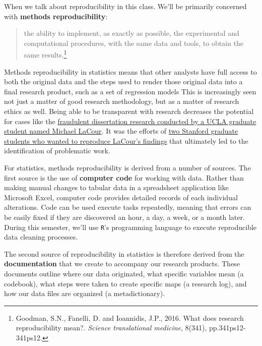 \documentclass[]{book}
\let\rmarkdownfootnote\footnote%
\def\footnote{\protect\rmarkdownfootnote}
\theoremstyle{definition}
\theoremstyle{definition}
\theoremstyle{remark}
\begin{document}
When we talk about reproducibility in this class. We'll be primarily
concerned with \textbf{methods reproducibility}:

\begin{quote}
the ability to implement, as exactly as possible, the experimental and
computational procedures, with the same data and tools, to obtain the
same results.\footnote{Goodman, S.N., Fanelli, D. and Ioannidis, J.P.,
  2016. What does research reproducibility mean?. \emph{Science
  translational medicine}, 8(341), pp.341ps12-341ps12.}
\end{quote}

Methods reproducibility in statistics means that other analysts have
full access to both the original data and the steps used to render those
original data into a final research product, such as a set of regression
models This is increasingly seen not just a matter of good research
methodology, but as a matter of research ethics as well. Being able to
be transparent with research decreases the potential for cases like the
\href{http://nymag.com/scienceofus/2015/05/how-a-grad-student-uncovered-a-huge-fraud.html}{fraudulent
dissertation research conducted by a UCLA graduate student named Michael
LaCour}. It was the efforts of
\href{https://fivethirtyeight.com/features/how-two-grad-students-uncovered-michael-lacour-fraud-and-a-way-to-change-opinions-on-transgender-rights/}{two
Stanford graduate students who wanted to reproduce LaCour's findings}
that ultimately led to the identification of problematic work.

For statistics, methods reproducibility is derived from a number of
sources. The first source is the use of \textbf{computer code} for
working with data. Rather than making manual changes to tabular data in
a spreadsheet application like Microsoft Excel, computer code provides
detailed records of each individual alterations. Code can be used
execute tasks repeatedly, meaning that errors can be easily fixed if
they are discovered an hour, a day, a week, or a month later. During
this semester, we'll use \texttt{R}'s programming language to execute
reproducible data cleaning processes.

The second source of reproducibility in statistics is therefore derived
from the \textbf{documentation} that we create to accompany our research
products. These documents outline where our data originated, what
specific variables mean (a codebook), what steps were taken to create
specific maps (a research log), and how our data files are organized (a
metadictionary).
\end{document}
